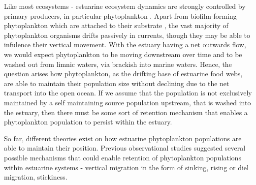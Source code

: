 \documentclass[npg, manuscript]{copernicus}
\begin{document}
Like most ecosystems - estuarine ecosystem dynamics are strongly controlled by primary producers, in particular phytoplankton \citep{Chen2023}.
Apart from biofilm-forming phytoplankton which are attached to their substrate \citep{Cheah2022},
the vast majority of phytoplankton organisms drifts passively in currents, though they may be able to infulence their vertical movement.
With the estuary having a net outwards flow, we would expect phytoplankton to be moving downstream over time and to be washed out from limnic waters, via brackish into marine waters.
Hence, the question arises how phytoplankton, as the drifting base of estuarine food webs, are able to maintain their population size without declining due to the net transport into the open ocean.
If we assume that the population is not exclusively maintained by  a self maintaining source population upstream, that is washed into the estuary, then there must be some sort of retention mechanism that enables a phytoplankton population to persist within the estuary.




So far, different theories exist on how estuarine phytoplankton populations are able to maintain their position. Previous observational studies suggested several possible mechanisms that could enable retention of phytoplankton populations within estuarine systems - vertical migration in the form of sinking,  rising or diel migration, stickiness.
\end{document}
